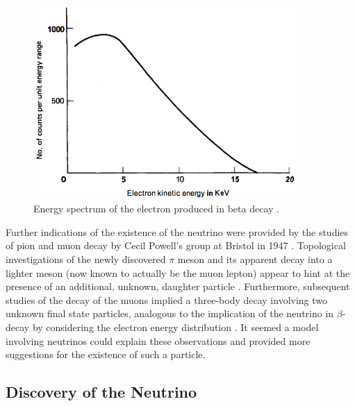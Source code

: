 \begin{figure}
  \centering
  \includegraphics[width=10cm]{ElectronEnergySpectrumBetaDecay.png}
  \caption[Energy spectrum of the electron produced in beta decay.]{Energy spectrum of the electron produced in beta decay \cite{Lewis1970}.}
  \label{fig:BetaDecayEnergy}
\end{figure}

Further indications of the existence of the neutrino were provided by the studies of pion and muon decay by Cecil Powell's group at Bristol in 1947 \cite{Lattes1947-159,Lattes1947-160}.  Topological investigations of the newly discovered $\pi$ meson and its apparent decay into a lighter meson (now known to actually be the muon lepton) appear to hint at the presence of an additional, unknown, daughter particle \cite{Lattes1947-159}.  Furthermore, subsequent studies of the decay of the muons implied a three-body decay involving two unknown final state particles, analogous to the implication of the neutrino in $\beta$-decay by considering the electron energy distribution \cite{Brown1949}.  It seemed a model involving neutrinos could explain these observations and provided more suggestions for the existence of such a particle.

\subsection{Discovery of the Neutrino}\label{NeutrinoDiscovery}

